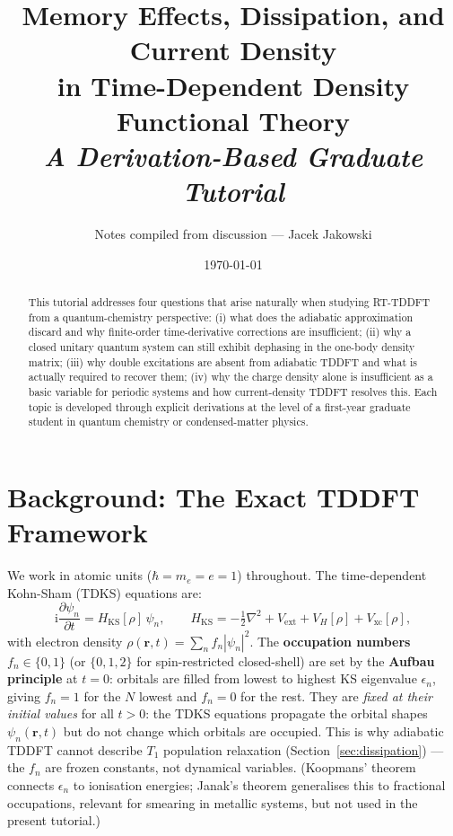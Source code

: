 \documentclass[12pt,letterpaper]{article}
\newcommand{\ii}{\mathrm{i}}
\newcommand{\Hks}{H_{\mathrm{KS}}}
\newcommand{\Vxc}{V_{\mathrm{xc}}}
\theoremstyle{definition}
\begin{document}
\title{\Large\bfseries Memory Effects, Dissipation, and Current Density\\
in Time-Dependent Density Functional Theory\\[6pt]
\normalsize\textit{A Derivation-Based Graduate Tutorial}}

\author{Notes compiled from discussion --- Jacek Jakowski}
\date{\today}
\maketitle

\begin{abstract}
This tutorial addresses four questions that arise naturally when studying
RT-TDDFT from a quantum-chemistry perspective:
(i) what does the adiabatic approximation discard and why finite-order
time-derivative corrections are insufficient;
(ii) why a closed unitary quantum system can still exhibit dephasing in
the one-body density matrix;
(iii) why double excitations are absent from adiabatic TDDFT and what
is actually required to recover them;
(iv) why the charge density alone is insufficient as a basic variable
for periodic systems and how current-density TDDFT resolves this.
Each topic is developed through explicit derivations at the level of a
first-year graduate student in quantum chemistry or condensed-matter physics.
\end{abstract}

\tableofcontents
\newpage

\section{Background: The Exact TDDFT Framework}
\label{sec:background}

We work in atomic units ($\hbar = m_e = e = 1$) throughout.
The time-dependent Kohn-Sham (TDKS) equations are:
\begin{equation}
  \ii\frac{\partial\psi_n}{\partial t} = \Hks[\rho]\,\psi_n,
  \qquad
  \Hks = -\tfrac{1}{2}\nabla^2 + V_{\mathrm{ext}} + V_H[\rho] + \Vxc[\rho],
  \label{eq:tdks}
\end{equation}
with electron density $\rho(\bm{r},t) = \sum_n f_n|\psi_n|^2$.
The \textbf{occupation numbers} $f_n \in \{0,1\}$ (or $\{0,1,2\}$ for
spin-restricted closed-shell) are set by the \textbf{Aufbau principle}
at $t=0$: orbitals are filled from lowest to highest KS eigenvalue
$\epsilon_n$, giving $f_n = 1$ for the $N$ lowest and $f_n = 0$ for
the rest.
They are \emph{fixed at their initial values} for all $t>0$: the TDKS
equations propagate the orbital shapes $\psi_n(\bm{r},t)$ but do not
change which orbitals are occupied.
This is why adiabatic TDDFT cannot describe $T_1$ population relaxation
(Section~\ref{sec:dissipation}) --- the $f_n$ are frozen constants, not
dynamical variables.
(Koopmans' theorem connects $\epsilon_n$ to ionisation energies;
Janak's theorem generalises this to fractional occupations, relevant for
smearing in metallic systems, but not used in the present tutorial.)
\end{document}
